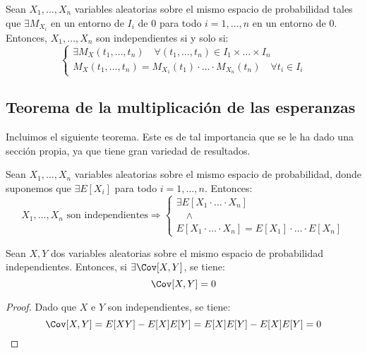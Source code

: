 \begin{prop}
    Sean $X_1, \ldots, X_n$ variables aleatorias sobre el mismo espacio de probabilidad tales que $\exists M_{X_i}$ en un entorno de $I_i$ de $0$ para todo $i = 1, \ldots, n$ en un entorno de $0$. Entonces, $X_1, \ldots, X_n$ son independientes si y solo si:
    \[
        \left\{
            \begin{array}{l}
                \exists M_X(t_1, \ldots, t_n) \quad \forall (t_1, \ldots, t_n) \in I_1 \times \ldots \times I_n \\
                M_X(t_1, \ldots, t_n) = M_{X_1}(t_1) \cdot \ldots \cdot M_{X_n}(t_n) \quad \forall t_i \in I_i
            \end{array}
        \right.
    \]
\end{prop}


\subsection{Teorema de la multiplicación de las esperanzas}
Incluimos el siguiente teorema. Este es de tal importancia que se le ha dado una sección propia, ya que tiene gran variedad de resultados.
\begin{teo}
    Sean $X_1, \ldots, X_n$ variables aleatorias sobre el mismo espacio de probabilidad, donde suponemos que $\exists E[X_i]$ para todo $i = 1, \ldots, n$. Entonces:
    \begin{equation*}
        X_1, \ldots, X_n \text{ son independientes} \Longrightarrow \left\{
            \begin{array}{l}
                \exists E[X_1 \cdot \ldots \cdot X_n] \\
                \quad \land \\
                E[X_1 \cdot \ldots \cdot X_n] = E[X_1] \cdot \ldots \cdot E[X_n]
            \end{array}
        \right.
    \end{equation*}
\end{teo}

\begin{coro}
    Sean $X,Y$ dos variables aleatorias sobre el mismo espacio de probabilidad independientes. Entonces, si $\exists \Cov[X,Y]$, se tiene:
    \[
        \Cov[X,Y] = 0
    \]
\end{coro}
\begin{proof}
    Dado que $X$ e $Y$ son independientes, se tiene:
    \[
        \Cov[X,Y] = E[XY] - E[X]E[Y] = E[X]E[Y] - E[X]E[Y] = 0
    \]
\end{proof}

